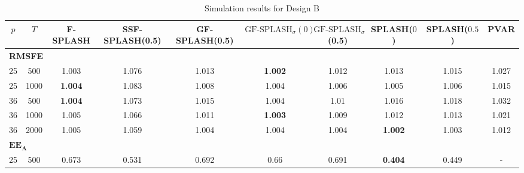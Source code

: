 \begin{landscape}
    \bgroup
    \def\arraystretch{1.3}
    \begin{table}[!h]
    \footnotesize
    \centering
    \caption{Simulation results for Design B}
    \label{tab:results_designB}
    \begin{tabular}{cccccccccc}    
    \hline \hline
    $p$  &  $T$   &  F-SPLASH  &  SSF-SPLASH(0.5)  &  GF-SPLASH(0.5)  &  $\text{GF-SPLASH}_\sigma(0)$  &  $\text{GF-SPLASH}_\sigma$(0.5)  &  SPLASH($0$)  &  SPLASH($0.5$)  &  PVAR  \\
    \hline
    \multicolumn{10}{l}{\textbf{RMSFE}} \\
	\hline
	 25  & 500  & 1.003                 &                 1.076                 &                      1.013                       & \textbf{1.002}                                 &                      1.012                       & 1.013                    &           1.015            &       1.027       \\
	 25  & 1000 & \textbf{1.004}        &                 1.083                 &                      1.008                       & 1.004                                          &                      1.006                       & 1.005                    &           1.006            &       1.015       \\
	 36  & 500  & \textbf{1.004}        &                 1.073                 &                      1.015                       & 1.004                                          &                       1.01                       & 1.016                    &           1.018            &       1.032       \\
	 36  & 1000 & 1.005                 &                 1.066                 &                      1.011                       & \textbf{1.003}                                 &                      1.009                       & 1.012                    &           1.013            &       1.021       \\
	 36  & 2000 & 1.005                 &                 1.059                 &                      1.004                       & 1.004                                          &                      1.004                       & \textbf{1.002}           &           1.003            &       1.012       \\
	\hline
	\multicolumn{10}{l}{$\mathbf{EE_A}$} \\
	\hline
	 25  & 500  &         0.673         &                 0.531                 &                      0.692                       &                      0.66                      &                      0.691                       & \textbf{0.404}           &           0.449            & -                 \\

\end{tabular}
\end{table}
\end{landscape}
